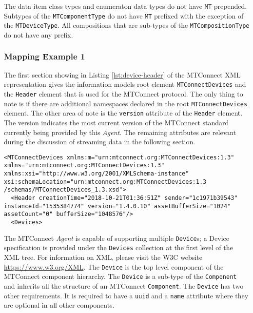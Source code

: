 The data item class types and enumeraton data types do not have \texttt{MT} prepended. Subtypes of the \texttt{MTComponentType} do not have \texttt{MT} prefixed with the exception of the \texttt{MTDeviceType}. All compositions that are sub-types of the \texttt{MTCompositionType} do not have any prefix.

\subsubsection{Mapping Example 1}

The first section showing in Listing \ref{lst:device-header} of the MTConnect XML representation gives the information models root element \texttt{MTConnectDevices} and the \texttt{Header} element that is used for the MTConnect protocol. The only thing to note is if there are additional namespaces declared in the root \texttt{MTConnectDevices} element. The other area of note is the \texttt{version} attribute of the \texttt{Header} element.  The version indicates the most current version of the MTConnect standard currently being provided by this \textit{Agent}. The remaining attributes are relevant during the discussion of streaming data in the following section.

\begin{lstlisting}[caption={Device Header},label={lst:device-header}]
<MTConnectDevices xmlns:m="urn:mtconnect.org:MTConnectDevices:1.3" xmlns="urn:mtconnect.org:MTConnectDevices:1.3" xmlns:xsi="http://www.w3.org/2001/XMLSchema-instance" xsi:schemaLocation="urn:mtconnect.org:MTConnectDevices:1.3 /schemas/MTConnectDevices_1.3.xsd">
  <Header creationTime="2018-10-21T01:36:51Z" sender="1c1971b39543" instanceId="1535384774" version="1.4.0.10" assetBufferSize="1024" assetCount="0" bufferSize="1048576"/>
  <Devices>
\end{lstlisting}

The MTConnect \textit{Agent} is capable of supporting multiple \texttt{Device}s; a Device specification is provided under the \texttt{Devices} collection at the first level of the XML tree. For information on XML, please visit the W3C website \url{https://www.w3.org/XML}. The \texttt{Device} is the top level component of the MTConnect component hierarchy. The \texttt{Device} is a sub-type of the \texttt{Component} and inherits all the structure of an MTConnect \texttt{Component}. The \texttt{Device} has two other requirements. It is required to have a \texttt{uuid} and a \texttt{name} attribute where they are optional in all other components. 

